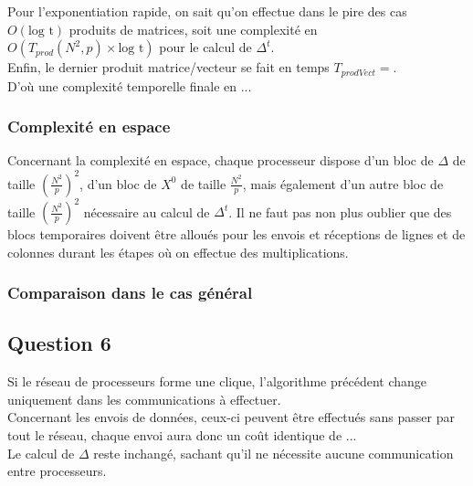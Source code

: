 \documentclass{article}
\begin{document}
Pour l'exponentiation rapide, on sait qu'on effectue dans le pire des cas $O(\text{log t})$ produits de matrices, soit une complexité en $O(T_{prod}(N^2,p)\times \text{log t})$ pour le calcul de $\Delta^t$. \\ %

Enfin, le dernier produit matrice/vecteur se fait en temps $T_{prodVect} = $. \\ %

D'où une complexité temporelle finale en ... %

\subsubsection*{Complexité en espace}

Concernant la complexité en espace, chaque processeur dispose d'un bloc de $\Delta$ de taille $\left(\frac{N^2}{p}\right)^2$, d'un bloc de $X^0$ de taille $\frac{N^2}{p}$, mais également d'un autre bloc de taille $\left(\frac{N^2}{p}\right)^2$ nécessaire au calcul de $\Delta^t$. Il ne faut pas non plus oublier que des blocs temporaires doivent être alloués pour les envois et réceptions de lignes et de colonnes durant les étapes où on effectue des multiplications. %

\subsubsection*{Comparaison dans le cas général} 


\subsection*{Question 6}

Si le réseau de processeurs forme une clique, l'algorithme précédent change uniquement dans les communications à effectuer. \\

Concernant les envois de données, ceux-ci peuvent être effectués sans passer par tout le réseau, chaque envoi aura donc un coût identique de ... \\ %

Le calcul de $\Delta$ reste inchangé, sachant qu'il ne nécessite aucune communication entre processeurs. \\
\end{document}
